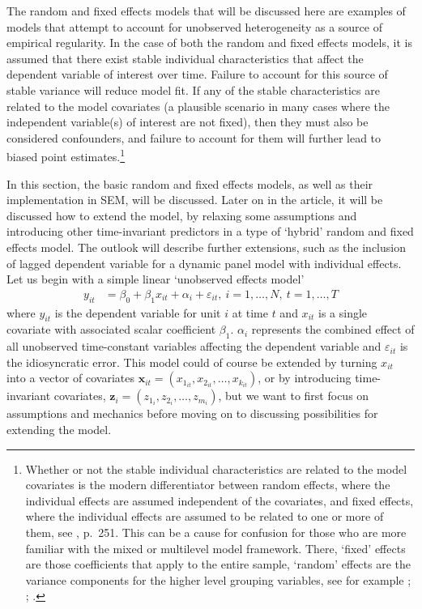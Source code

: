 \documentclass[]{interact}
\theoremstyle{plain}%
\theoremstyle{definition}
\theoremstyle{remark}
\begin{document}
The random and fixed effects models that will be discussed here are
examples of models that attempt to account for unobserved heterogeneity
as a source of empirical regularity. In the case of both the random and
fixed effects models, it is assumed that there exist stable individual
characteristics that affect the dependent variable of interest over
time. Failure to account for this source of stable variance will reduce
model fit. If any of the stable characteristics are related to the model
covariates (a plausible scenario in many cases where the independent
variable(s) of interest are not fixed), then they must also be
considered confounders, and failure to account for them will further
lead to biased point estimates.\footnote{Whether or not the stable
  individual characteristics are related to the model covariates is the
  modern differentiator between random effects, where the individual
  effects are assumed independent of the covariates, and fixed effects,
  where the individual effects are assumed to be related to one or more
  of them, see \citet{Wooldridge2012}, p.~251. This can be a cause for
  confusion for those who are more familiar with the mixed or multilevel
  model framework. There, `fixed' effects are those coefficients that
  apply to the entire sample, `random' effects are the variance
  components for the higher level grouping variables, see for example
  \citet{Hox2010}; \citet{Bates2015}; \citet{R-lme4}.}

In this section, the basic random and fixed effects models, as well as
their implementation in SEM, will be discussed. Later on in the article,
it will be discussed how to extend the model, by relaxing some
assumptions and introducing other time-invariant predictors in a type of
`hybrid' random and fixed effects model. The outlook will describe
further extensions, such as the inclusion of lagged dependent variable
for a dynamic panel model with individual effects.\\
Let us begin with a simple linear `unobserved effects model'
\citep{Wooldridge2012, R-plm_a} \begin{align}
y_{it} & = \beta_{0} + \beta_{1} x_{it} + \alpha_{i} + \varepsilon_{it}, \ i = 1, \ldots, N, \ t = 1, \ldots, T \label{eq:panel-model}
\end{align} where \(y_{it}\) is the dependent variable for unit \(i\) at
time \(t\) and \(x_{it}\) is a single covariate with associated scalar
coefficient \(\beta_{1}\). \(\alpha_{i}\) represents the combined effect
of all unobserved time-constant variables affecting the dependent
variable and \(\varepsilon_{it}\) is the idiosyncratic error. This model
could of course be extended by turning \(x_{it}\) into a vector of
covariates
\(\bm{x}_{it} = (x_{1_{it}}, x_{2_{it}}, \ldots, x_{k_{it}})\), or by
introducing time-invariant covariates,
\(\bm{z}_{i} = (z_{1_{i}}, z_{2_{i}}, \ldots, z_{m_{i}})\), but we want
to first focus on assumptions and mechanics before moving on to
discussing possibilities for extending the model.
\end{document}
